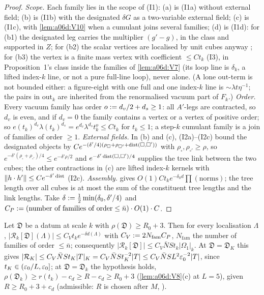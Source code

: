 \begin{proof}
\emph{Scope.} Each family lies in the scope of (I1): (a) is (I1a) without external field; (b) is (I1b) with the designated $\delta G$ as a two-variable external field; (c) is (I1c), with \cref{lem:a06d:V10} when a cumulant joins several families; (d) is (I1d): for (b1) the designated leg carries the multiplier $(g'-g)$, in the class and supported in $Z$; for (b2) the scalar vertices are localised by unit cubes anyway \cite[p.~420]{Ba3}; for (b3) the vertex is a finite mass vertex with coefficient $\le Ct_k$ (I3), in Proposition~1's class inside the families of \cref{lem:a06d:V7} (its loop line is $\delta_k$, a lifted index-$k$ line, or not a pure full-line loop), never alone. (A lone $\mathrm{out}$-term is not bounded either: a figure-eight with one full and one index-$k$ line is $\sim\lambda t\eta^{-1}$; the pairs in $\mathrm{out}_k$ are inherited from the renormalised vacuum part of $F_k$.) \emph{Order.} Every vacuum family has order $o:= d_v/2+d_s\ge1$: all $A'$-legs are contracted, so $d_v$ is even, and if $d_v=0$ the family contains a \cite[(1.6)]{Ba3} vertex or a \cite[(1.7)]{Ba3} vertex of positive order; so $e(t_k)^{d_v}\lambda(t_k)^{d_s}=e^{d_v}\lambda^{d_s}t_k^o\le Ct_k$ for $t_k\le1$; a step-$k$ cumulant family is a join of families of order $\ge1$. \emph{External fields.} In (b) and (c), (I2a)--(I2c) bound the designated objects by $Ce^{-(\delta'/4)(\rho_\square+\rho_{\square'}+\operatorname{dist}(\square,\square'))}$ with $\rho_\square,\rho_{\square'}\ge\rho$, so $e^{-\delta'(\rho_\square+\rho_{\square'})/4}\le e^{-\delta'\rho/2}$ and $e^{-\delta'\operatorname{dist}(\square,\square')/4}$ supplies the tree link between the two cubes; the other contractions in (c) are lifted index-$k$ kernels with $\lVert h\cdot h'\rVert\le Ce^{-\delta'\operatorname{dist}}$ (I2c). \emph{Assembly.} \cite[(1.33)]{Ba3} gives $O(1)Ct_ke^{-\delta_0d}\prod(\text{norms})$; the tree length over all cubes is at most the sum of the constituent tree lengths and the link lengths. Take $\delta:=\frac12\min(\delta_0,\delta'/4)$ and $C_P:=(\text{number of families of order}\le\bar n)\cdot O(1)\cdot C$.
\end{proof}

\begin{theorem}\label{thm:a06d:V12}
Let $\mathfrak D$ be a datum at scale $k$ with $\rho(\mathfrak D)\ge R_0+3$. Then for every localisation $\Lambda$, $|\mathcal R_k[\mathfrak D](\Lambda)|\le C_Vt_ke^{-\delta d(\Lambda)}$ with $C_V:=2N_{\mathrm{fam}}C_P$, $N_{\mathrm{fam}}$ the number of families of order $\le\bar n$; consequently $|\mathcal R_k[\mathfrak D]|\le C_V\bar NSt_k|\Omega_1|_k$. At $\mathfrak D=\mathfrak D_K$ this gives $|\mathcal R_K|\le C_V\bar NSt_K|T|_K=C_V\bar NSt_K^{-2}|T|\le C_V\bar NSL^2\varepsilon_0^{-2}|T|$, since $t_K\in(\varepsilon_0/L,\varepsilon_0]$; at $\mathfrak D=\mathfrak D_k$ the hypothesis holds, $\rho(\mathfrak D_k)\ge r(t_k)-c_d\ge R-c_d\ge R_0+3$ (\cref{lem:a06d:V8}(c) at $L=5$), given $R\ge R_0+3+c_d$ (admissible: $R$ is chosen after $M$, \cite[(2.7)]{Ba2}).
\end{theorem}

